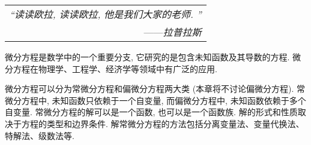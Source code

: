 \begin{flushright}
    \begin{tabular}{r|}
        \textit{“读读欧拉, 读读欧拉, 他是我们大家的老师. ”}\\
        ——\textit{拉普拉斯}
    \end{tabular}
\end{flushright}

微分方程是数学中的一个重要分支, 它研究的是包含未知函数及其导数的方程. 微分方程在物理学、工程学、经济学等领域中有广泛的应用. 

微分方程可以分为常微分方程和偏微分方程两大类 (本章将不讨论偏微分方程). 常微分方程中, 未知函数只依赖于一个自变量, 而偏微分方程中, 未知函数依赖于多个自变量. 
常微分方程的解可以是一个函数, 也可以是一个函数族. 解的形式和性质取决于方程的类型和边界条件. 解常微分方程的方法包括分离变量法、变量代换法、特解法、级数法等. 